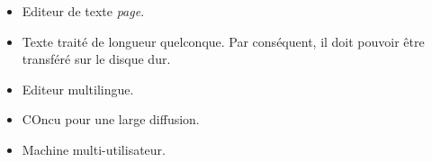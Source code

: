 \begin{itemize}
	\item Editeur de texte \textsl{page}.
	\item Texte traité de longueur quelconque. Par conséquent, il doit pouvoir être transféré sur le disque dur.
	\item Editeur multilingue.
	\item COncu pour une large diffusion.
	\item Machine multi-utilisateur.
\end{itemize}

